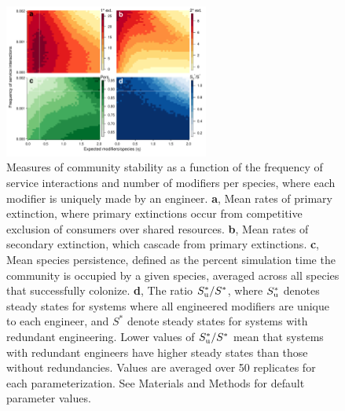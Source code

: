 \documentclass[twocolumn,preprintnumbers,amsmath,amssymb,superscriptaddress,linenumbers]{revtex4-1}
\begin{document}
\begin{figure}[h!]
\centering
\includegraphics[width=0.6\textwidth]{fig_engineers4_unique.pdf}
\caption{
Measures of community stability as a function of the frequency of service interactions and number of modifiers per species, where each modifier is uniquely made by an engineer.
\textbf{a}, Mean rates of primary extinction, where primary extinctions occur from competitive exclusion of consumers over shared resources.
\textbf{b}, Mean rates of secondary extinction, which cascade from primary extinctions.
\textbf{c}, Mean species persistence, defined as the percent simulation time the community is occupied by a given species, averaged across all species that successfully colonize.
\textbf{d}, The ratio $S^*_{\rm u}/S^*$, where $S^*_{\rm u}$ denotes steady states for systems where all engineered modifiers are unique to each engineer, and $S^*$ denote steady states for systems with redundant engineering. Lower values of $S^*_{\rm u}/S^*$ mean that systems with redundant engineers have higher steady states than those without redundancies.
Values are averaged over 50 replicates for each parameterization.
See Materials and Methods for default parameter values.
}
\label{fig:unique}
\end{figure}
\end{document}
